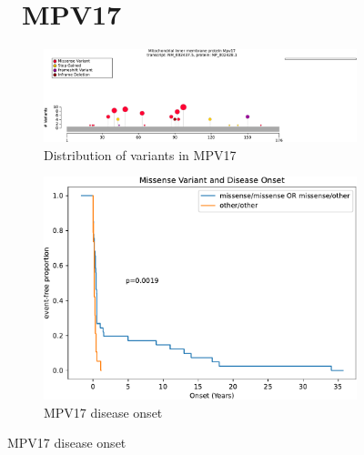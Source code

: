 \begin{figure}[htbp]
        \section*{ MPV17}
        \centering
        \begin{subfigure}[b]{0.95\textwidth}
        \centering
        \includegraphics[width=\textwidth]{ img/MPV17_protein_diagram.pdf} 
        \captionsetup{justification=raggedright,singlelinecheck=false}
        \caption{Distribution of variants in MPV17}
        \end{subfigure}
        
        \vspace{2em}
        
        \begin{subfigure}[b]{0.3\textwidth}
        \centering
        \includegraphics[width=\textwidth]{ img/MPV17_stats.pdf} 
        \captionsetup{justification=raggedright,singlelinecheck=false}
        \caption{MPV17 disease onset}
        \end{subfigure}
        
        \vspace{0.2em}
        

\end{figure}
